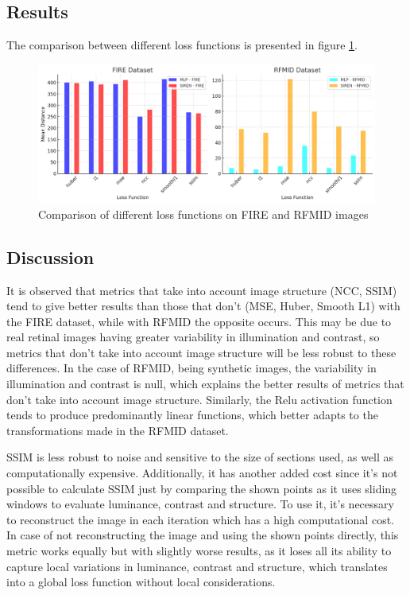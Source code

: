 \subsection{Results}
\label{subsec:Resultados-perda}

The comparison between different loss functions is presented in figure \ref{fig:loss_functions_comparison}.

\begin{figure}[tbp]
    \centering
    \includegraphics[width=1\textwidth]{imaxes/losstype.png}
    \caption{Comparison of different loss functions on FIRE and RFMID images}
    \label{fig:loss_functions_comparison}
\end{figure}

\subsection{Discussion}
\label{subsec:Discusion-loss}

It is observed that metrics that take into account image structure (NCC, SSIM) tend to give better results than those that don't (MSE, Huber, Smooth L1) with the FIRE dataset, while with RFMID the opposite occurs.
This may be due to real retinal images having greater variability in illumination and contrast, so metrics that don't take into account image structure will be less robust to these differences.
In the case of RFMID, being synthetic images, the variability in illumination and contrast is null, which explains the better results of metrics that don't take into account image structure.
Similarly, the Relu activation function tends to produce predominantly linear functions, which better adapts to the transformations made in the RFMID dataset.

SSIM is less robust to noise and sensitive to the size of sections used, as well as computationally expensive. Additionally, it has another added cost since it's not possible to calculate SSIM just by comparing the shown points as it uses sliding windows to evaluate luminance, contrast and structure.
To use it, it's necessary to reconstruct the image in each iteration which has a high computational cost.
In case of not reconstructing the image and using the shown points directly, this metric works equally but with slightly worse results, as it loses all its ability to capture local variations in luminance, contrast and structure, which translates into a global loss function without local considerations.

